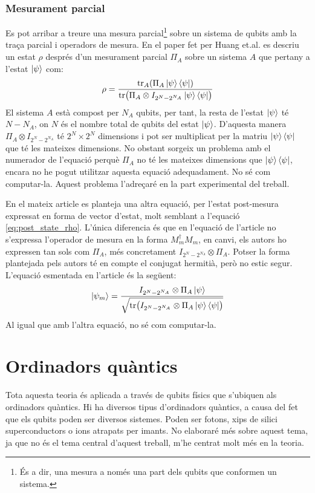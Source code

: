 \subsubsection{Mesurament parcial}
\label{par_measurament}
Es pot arribar a treure una mesura parcial\footnote{És a dir, una mesura a només una part dels qubits que conformen un sistema.} sobre un sistema de qubits amb la traça parcial i operadors de mesura. En el paper fet per Huang et.al. \cite{QGAN_exp} es descriu un estat $\rho$ després d'un mesurament parcial $\Pi_A$ sobre un sistema $A$ que pertany a l'estat $\ket{\psi}$ com:
$$
\rho = \frac{\tr_A(\Pi_A \ket{\psi}\bra{\psi})}{\tr(\Pi_A\otimes I_{2^N-2^{N_A}}\ket{\psi}\bra{\psi})}
$$
El sistema $A$ està compost per $N_A$ qubits, per tant, la resta de l'estat $\ket{\psi}$ té $N-N_A$, on $N$ és el nombre total de qubits del estat $\ket{\psi}$. D'aquesta manera $\Pi_A\otimes I_{2^N-2^{N_A}}$ té $2^N\times 2^N$ dimensions i pot ser multiplicat per la matriu $\ket{\psi}\bra{\psi}$ que té les mateixes dimensions. No obstant sorgeix un problema amb el numerador de l'equació perquè $\Pi_A$ no té les mateixes dimensions que $\ket{\psi}\bra{\psi}$, encara no he pogut utilitzar aquesta equació adequadament. No sé com computar-la. Aquest problema l'adreçaré en la part experimental del treball.

En el mateix article es planteja una altra equació, per l'estat post-mesura expressat en forma de vector d'estat, molt semblant a l'equació \ref{eq:post_state_rho}. L'única diferencia és que en l'equació de l'article no s'expressa l'operador de mesura en la forma $M_m^\dagger M_m$, en canvi, els autors ho expressen tan sols com $\Pi_A$, més concretament $I_{2^N-2^{N_A}}\otimes \Pi_A$. Potser la forma plantejada pels autors té en compte el conjugat hermitià, però no estic segur.
L'equació esmentada en l'article és la següent:
$$
\ket{\psi_m} = \frac{I_{2^N-2^{N_A}}\otimes\Pi_A\ket{\psi}}{\sqrt{\tr(I_{2^N-2^{N_A}}\otimes\Pi_A\ket{\psi}\bra{\psi})}}
$$
Al igual que amb l'altra equació, no sé com computar-la.

\section{Ordinadors quàntics}
Tota aquesta teoria és aplicada a través de qubits físics que s'ubiquen als ordinadors quàntics. Hi ha diversos tipus d'ordinadors quàntics, a causa del fet que els qubits poden ser diversos sistemes. Poden ser fotons, xips de silici superconductors o ions atrapats per imants. No elaboraré més sobre aquest tema, ja que no és el tema central d'aquest treball, m'he centrat molt més en la teoria.

